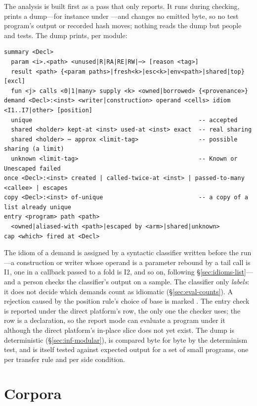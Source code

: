 The analysis is built first as a pass that only reports. It runs during checking, prints a dump---for
instance under ---and changes no emitted byte, so no test program's
output or recorded hash moves; nothing reads the dump but people and tests. The dump prints, per module:
\begin{Verbatim}
summary <Decl>
  param <i>.<path> <unused|R|RA|RE|RW|⋯> [reason <tag>]
  result <path> {<param paths>|fresh<k>|esc<k>|env<path>|shared|top} [excl]
  fun <j> calls <0|1|many> supply <k> <owned|borrowed> {<provenance>}
demand <Decl>:<inst> <writer|construction> operand <cells> idiom <I1..I7|other> [position]
  unique                                               -- accepted
  shared <holder> kept-at <inst> used-at <inst> exact  -- real sharing
  shared <holder> ⋯ approx <limit-tag>                 -- possible sharing (a limit)
  unknown <limit-tag>                                  -- Known or Unescaped failed
once <Decl>:<inst> created | called-twice-at <inst> | passed-to-many <callee> | escapes
copy <Decl>:<inst> of-unique                           -- a copy of a list already unique
entry <program> path <path>
  <owned|aliased-with <path>|escaped by <arm>|shared|unknown>
cap <which> fired at <Decl>
\end{Verbatim}
The idiom of a demand is assigned by a syntactic classifier written before the run---a construction or
writer whose operand is a parameter rebound by a tail call is I1, one in a callback passed to a fold is I2,
and so on, following \S\ref{sec:idioms-list}---and a person checks the classifier's output on a sample. The
classifier only \emph{labels}: it does not decide which demands count as idiomatic (\S\ref{sec:eval-counts}).
A rejection caused by the position rule's choice of base is marked . The entry check is
reported under the direct platform's row, the only one the checker uses; the row is a declaration, so the
report mode can evaluate a program under it although the direct platform's in-place slice does not yet
exist. The dump is deterministic (\S\ref{sec:inf-modular}), is
compared byte for byte by the determinism test, and is itself tested against expected output for a set of
small programs, one per transfer rule and per side condition.

\section{Corpora}
\label{sec:eval-corpora}

